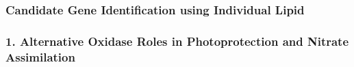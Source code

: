 \documentclass[10pt,letterpaper]{article}
\begin{document}


\subsubsection*{Candidate Gene Identification using Individual Lipid}
\subsubsection*{1. Alternative Oxidase Roles in Photoprotection and Nitrate Assimilation}
\end{document}
